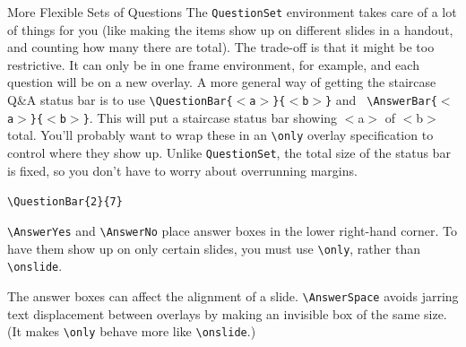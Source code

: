 \documentclass[10pt]{beamer}
\begin{document}
\begin{frame}{More Flexible Sets of Questions}
The \texttt{QuestionSet} environment takes care of a lot of things for you (like making the items show up on different slides in a handout, and counting how many there are total). The trade-off is that it might be too restrictive. It can only be in one frame environment, for example, and each question will be on a new overlay.
\vfill
A more general way of getting the staircase Q\&A status bar is to use \texttt{\textbackslash QuestionBar\{$<$a$>$\}\{$<$b$>$\}}
and \texttt{ \textbackslash AnswerBar\{$<$a$>$\}\{$<$b$>$\}}. This will put a staircase status bar showing $<$a$>$ of $<$b$>$ total. You'll probably want to wrap these in an \texttt{\textbackslash only} overlay specification to control where they show up. Unlike \texttt{QuestionSet}, the total size of the status bar is fixed, so you don't have to worry about overrunning margins.\vfill

\texttt{\textbackslash QuestionBar\{2\}\{7\}}
\end{frame}

\begin{frame}
\AnswerYes
 \texttt{\textbackslash AnswerYes} and  \texttt{\textbackslash AnswerNo} place answer boxes in the lower right-hand corner. To have them show up on only certain slides, you must use \texttt{\textbackslash only}, rather than \texttt{\textbackslash onslide}.\vfill
 

 The answer boxes can affect the alignment of a slide.   \texttt{\textbackslash AnswerSpace}  avoids jarring text displacement between overlays by making an invisible box of the same size. (It makes \texttt{\textbackslash only} behave more like \texttt{\textbackslash onslide}.)
\end{frame}
\end{document}
